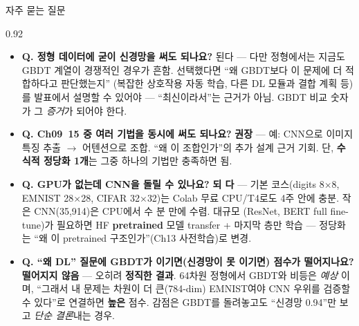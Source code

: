 \begin{frame}{자주 묻는 질문}
\begin{center}\begin{varwidth}{0.92\textwidth}
  \small
  \begin{itemize}
    \item \textbf{Q. 정형 데이터에 굳이 신경망을 써도 되나요?} \;
      된다 — 다만 정형에서는 지금도 GBDT 계열이 경쟁적인 경우가 흔함.
      선택했다면 ``왜 GBDT보다 이 문제에 더 적합하다고 판단했는지''
      (복잡한 상호작용 자동 학습, 다른 DL 모듈과 결합 계획 등)를
      발표에서 설명할 수 있어야 — ``최신이라서''는 근거가 아님.
      GBDT 비교 숫자가 그 \textit{증거}가 되어야 한다.
    \item \textbf{Q. Ch09~15 중 여러 기법을 동시에 써도 되나요?} \;
      \textbf{권장} — 예: CNN으로 이미지 특징 추출 $\to$ 어텐션으로
      조합. ``왜 이 조합인가''의 추가 설계 근거 기회. 단,
      \textbf{수식적 정당화 1개}는 그중 하나의 기법만 충족하면 됨.
    \item \textbf{Q. GPU가 없는데 CNN을 돌릴 수 있나요?} \; \textbf{되
      다} — 기본 코스(digits 8$\times$8, EMNIST 28$\times$28,
      CIFAR 32$\times$32)는 Colab 무료 CPU/T4로도 4주 안에 충분.
      작은 CNN(35,914)은 CPU에서 수 분 만에 수렴. 대규모
      (ResNet, BERT full fine-tune)가 필요하면 HF \textbf{pretrained}
      모델 transfer + 마지막 층만 학습 — 정당화는 ``왜 이 pretrained
      구조인가''(Ch13 사전학습)로 변경.
    \item \textbf{Q. ``왜 DL'' 질문에 GBDT가 이기면(신경망이 못
      이기면) 점수가 떨어지나요?} \; \textbf{떨어지지 않음} — 오히려
      \textbf{정직한 결과}. 64차원 정형에서 GBDT와 비등은 \textit{예상
      }이며, ``그래서 내 문제는 차원이 더 큰(784-dim) EMNIST여야 CNN
      우위를 검증할 수 있다''로 연결하면 \textbf{높은} 점수.
      감점은 GBDT를 돌려놓고도 ``신경망 0.94''만 보고 \textit{단순
      결론}내는 경우.
  \end{itemize}
\end{varwidth}\end{center}
\end{frame}
